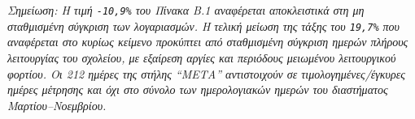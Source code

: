 \noindent\textit{Σημείωση: Η τιμή \texttt{-10,9\%} του Πίνακα Β.1 αναφέρεται αποκλειστικά στη μη σταθμισμένη σύγκριση των λογαριασμών. Η τελική μείωση της τάξης του \texttt{19,7\%} που αναφέρεται στο κυρίως κείμενο προκύπτει από σταθμισμένη σύγκριση ημερών πλήρους λειτουργίας του σχολείου, με εξαίρεση αργίες και περιόδους μειωμένου λειτουργικού φορτίου. Οι 212 ημέρες της στήλης ``ΜΕΤΑ'' αντιστοιχούν σε τιμολογημένες/έγκυρες ημέρες μέτρησης και όχι στο σύνολο των ημερολογιακών ημερών του διαστήματος Μαρτίου--Νοεμβρίου.}
